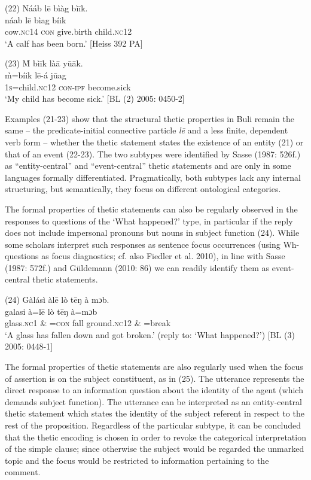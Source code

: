 \documentclass[output=paper]{langsci/langscibook}
\begin{document}
\ea
\glll \textup{(22)}  Nááb    l\={e}  bìàg    bì\={i}k.\\
  \textup{  náab    l\={e}  bìag    bíik}\\
       cow.\textsc{nc}14  \textsc{con}   give.birth  child.\textsc{nc}12\\
\glt ‘A calf has been born.’ [Heiss 392 PA]
\z

\ea
\glll \textup{(23)}  \`{M}  bì\={i}k      là\={a}    y\={u}\={a}k.\\
  \textup{  \`{m}=bíik      l\={e}-á    j\={u}ag}\\
       1\textsc{s}=child.\textsc{nc}12    \textsc{con}{}-\textsc{ipf}  become.sick\\
\glt ‘My child has become sick.’ [BL (2) 2005: 0450-2]
\z

Examples (21-23) show that the structural thetic properties in Buli remain the same – the predicate-initial connective particle \textit{l\={e} }and a less finite, dependent verb form – whether the thetic statement states the existence of an entity (21) or that of an event (22-23). The two subtypes were identified by Sasse (1987: 526f.) as “entity-central” and “event-central” thetic statements and are only in some languages formally differentiated. Pragmatically, both subtypes lack any internal structuring, but semantically, they focus on different ontological categories.

The formal properties of thetic statements can also be regularly observed in the responses to questions of the ‘What happened?’ type, in particular if the reply does not include impersonal pronouns but nouns in subject function (24). While some scholars interpret such responses as sentence focus occurrences (using Wh-questions as focus diagnostics; cf. also Fiedler et al. 2010), in line with Sasse (1987: 572f.) and Güldemann (2010: 86) we can readily identify them as event-central thetic statements. 

\ea
\glll \textup{(24)}  Gàlásì    àl\={e}    lò  t\={e}ŋ    à   mɔb.\\
  \textup{  galasi}\textup{     à=l\={e}    lò  t\={e}ŋ    à=mɔb}\\
       glass.\textsc{nc}1  \& =\textsc{con}  fall  ground.\textsc{nc}12  \& =break\\
\glt ‘A glass has fallen down and got broken.’ (reply to: ‘What happened?’) [BL (3) 2005: 0448-1]
\z

The formal properties of thetic statements are also regularly used when the focus of assertion is on the subject constituent, as in (25). The utterance represents the direct response to an information question about the identity of the agent (which demands subject function). The utterance can be interpreted as an entity-central thetic statement which states the identity of the subject referent in respect to the rest of the proposition. Regardless of the particular subtype, it can be concluded that the thetic encoding is chosen in order to revoke the categorical interpretation of the simple clause; since otherwise the subject would be regarded the unmarked topic and the focus would be restricted to information pertaining to the comment. 
\end{document}
